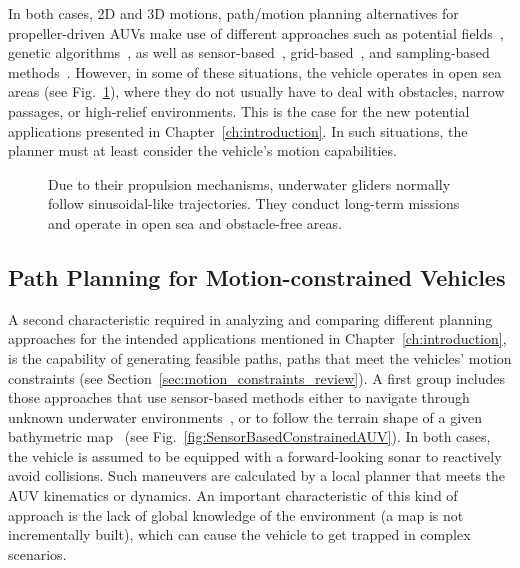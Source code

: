 In both cases, \ie \ac{2D} and \ac{3D} motions, path/motion planning
alternatives for propeller-driven \acp{AUV} make use of different approaches
such as potential fields~\cite{Warren1990,Sequeira1994}, genetic
algorithms~\cite{Sugihara1997,Alvarez2004,Hong-jian2004}, as well as
sensor-based~\cite{Ying2000,Houts2012},
grid-based~\cite{Sequeira1994,Arinaga1996,Carroll1992,Garau2005,Rao2009,Yan2012,Kim2012a},
and sampling-based
methods~\cite{Tan2004,Rao2009,Caldwell2010,Poppinga2011,Heo2013,McMahon2016}.
However, in some of these situations, the vehicle operates in open sea areas
(see Fig.~\ref{fig:GlidersMissions}), where they do not usually have to deal
with obstacles, narrow passages, or high-relief environments. This is the case
for the new potential applications presented in Chapter~\ref{ch:introduction}.
In such situations, the planner must at least consider the vehicle's motion
capabilities.

\begin{figure}[htbp]
    \myfloatalign
     \quad
\caption[Examples of underwater gliders missions.]
{\protect {} Due to their propulsion mechanisms,
underwater gliders normally follow sinusoidal-like trajectories.
\protect {} They conduct long-term missions
and operate in open sea and obstacle-free areas.}
\label{fig:GlidersMissions}
\end{figure}

\subsection{Path Planning for Motion-constrained Vehicles}

A second characteristic required in analyzing and comparing different planning
approaches for the intended applications mentioned in
Chapter~\ref{ch:introduction}, is the capability of generating feasible paths,
\ie paths that meet the vehicles' motion constraints (see
Section~\ref{sec:motion_constraints_review}). A first group includes those
approaches that use sensor-based methods either to navigate through unknown
underwater environments~\cite{Ying2000}, or to follow the terrain shape of a
given bathymetric map~\cite{Houts2012} (see
Fig.~\ref{fig:SensorBasedConstrainedAUV}). In both cases, the vehicle is assumed
to be equipped with a forward-looking sonar to reactively avoid collisions. Such
maneuvers are calculated by a local planner that meets the \ac{AUV} kinematics
or dynamics. An important characteristic of this kind of approach is the lack of
global knowledge of the environment (\ie a map is not incrementally built),
which can cause the vehicle to get trapped in complex scenarios.

